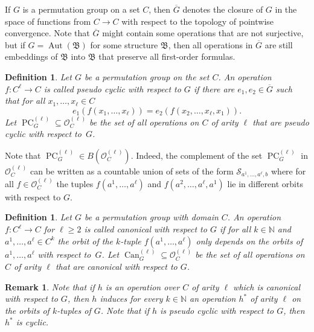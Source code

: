 \documentclass[nonacm]{acmart}
\newcommand{\bB}{{\mathfrak B}}
\DeclareMathOperator{\Can}{Can}
\DeclareMathOperator{\PC}{PC}
\DeclareMathOperator{\Aut}{Aut}
\newtheorem{definition}[theorem]{Definition}
\newtheorem{remark}[theorem]{Remark}
\begin{document}
If $G$ is a permutation group on a set $C$, then $\overline G$ denotes the closure of $G$ in the space
of functions from $C \to C$ with respect to the topology of pointwise convergence. Note that 
$\overline G$ might contain some operations that are not surjective, but if $G = \Aut(\bB)$ for some structure $\bB$, then all operations in $\overline G$ are still embeddings of $\bB$ into $\bB$ that preserve all first-order formulas. 

\begin{definition}
Let $G$ be a permutation group on the set $C$. 
An operation $f \colon C^{\ell} \to C$ is called \emph{pseudo cyclic with respect to $G$} if 
there are $e_1,e_2 \in \overline G$ such that for all $ x_1,\dots,x_{\ell} \in C$
$$e_1(f(x_1,\dots,x_{\ell})) = e_2(f(x_2,\dots,x_{\ell},x_1)).$$
Let $\PC_G^{(\ell)} \subseteq {\mathscr O}_C^{(\ell)}$ be the set of all operations on $C$ of arity $\ell$ that are pseudo cyclic with respect to~$G$. 
\end{definition} 

Note that $\PC_G^{(\ell)} \in B({\mathscr O}^{(\ell)}_C)$. Indeed, the complement of the set $\PC_G^{(\ell)}$ in ${\mathscr O}^{(\ell)}_C$ can be written as a countable union of sets of the form ${\mathscr S}_{a^1,\dots,a^{\ell},b}$ where for all 
$f \in {\mathscr O}_C^{(\ell)}$ 
the tuples $f(a^1,\dots,a^{\ell})$ and $f(a^2,\dots,a^{\ell},a^1)$ lie in different orbits with respect to $G$.

\begin{definition}
Let $G$ be a permutation group with domain $C$. 
An operation $f \colon C^{\ell} \to C$ for $\ell \geq 2$ is called \emph{canonical with respect to $G$} if for all $k \in {\mathbb N}$ and $a^1,\dots,a^{\ell} \in C^k$ the orbit of the $k$-tuple
$f(a^1,\dots,a^{\ell})$ only depends on the orbits of $a^1,\dots,a^{\ell}$ with respect to~$G$. Let $\Can_G^{(\ell)} \subseteq {\mathscr O}_C^{(\ell)}$ be the set of all operations on $C$ of arity $\ell$ that are canonical with respect to $G$. 
\end{definition} 

\begin{remark}\label{rem:can-act}
Note that if 
 $h$ is an operation over $C$ of arity $\ell$ which is canonical with respect to $G$,  then 
$h$ induces for every $k \in {\mathbb N}$ an operation $h^*$ of arity $\ell$ on the orbits of $k$-tuples
of $G$.
Note that if $h$ is pseudo cyclic with respect to $G$, then $h^*$ is cyclic.
\end{remark}
\end{document}
